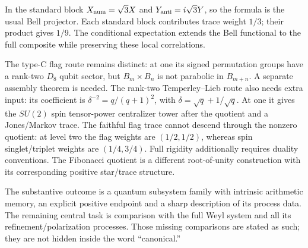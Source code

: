 In the standard block $X_{\rm num}=\sqrt3X$ and
$Y_{\rm anti}=i\sqrt3Y$, so the formula is the usual Bell projector.
Each standard block contributes trace weight $1/3$; their product gives
$1/9$. The conditional expectation extends the Bell functional to the
full composite while preserving these local correlations.

The type-C flag route remains distinct: at one its signed permutation
groups have a rank-two $D_8$ qubit sector, but
$B_m\times B_n$ is not parabolic in $B_{m+n}$. A separate assembly theorem
is needed. The rank-two Temperley--Lieb route also needs extra input:
its coefficient is $\delta^{-2}=q/(q+1)^2$, with
$\delta=\sqrt q+1/\sqrt q$. At one it gives the $SU(2)$ spin tensor-power
centralizer tower after the quotient and a Jones/Markov trace. The
faithful flag trace cannot descend through the nonzero quotient: at level
two the flag weights are $(1/2,1/2)$, whereas spin singlet/triplet weights
are $(1/4,3/4)$. Full rigidity additionally requires duality conventions.
The Fibonacci quotient is a different root-of-unity construction with
its corresponding positive star/trace structure.

The substantive outcome is a quantum subsystem family with intrinsic
arithmetic memory, an explicit positive endpoint and a sharp description
of its process data. The remaining central task is comparison with the
full Weyl system and all its refinement/polarization processes. Those
missing comparisons are stated as such; they are not hidden inside the
word ``canonical.''
